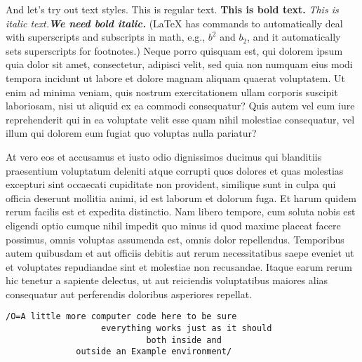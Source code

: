 And let's try out text styles.  This is regular text. \textbf{This is bold text.} \textit{This is italic text.}\textbf{\textit{We need bold italic.}} (LaTeX has commands to automatically deal with superscripts and subscripts in math, e.g., $b^{2}$ and $b_{2}$, and it automatically sets superscripts for footnotes.)  Neque porro quisquam est, qui dolorem ipsum quia dolor sit amet, consectetur, adipisci velit, sed quia non numquam eius modi tempora incidunt ut labore et dolore magnam aliquam quaerat voluptatem. Ut enim ad minima veniam, quis nostrum exercitationem ullam corporis suscipit laboriosam, nisi ut aliquid ex ea commodi consequatur? Quis autem vel eum iure reprehenderit qui in ea voluptate velit esse quam nihil molestiae consequatur, vel illum qui dolorem eum fugiat quo voluptas nulla pariatur? 

At vero eos et accusamus et iusto odio dignissimos ducimus qui blanditiis praesentium voluptatum deleniti atque corrupti quos dolores et quas molestias excepturi sint occaecati cupiditate non provident, similique sunt in culpa qui officia deserunt mollitia animi, id est laborum et dolorum fuga. Et harum quidem rerum facilis est et expedita distinctio. Nam libero tempore, cum soluta nobis est eligendi optio cumque nihil impedit quo minus id quod maxime placeat facere possimus, omnis voluptas assumenda est, omnis dolor repellendus. Temporibus autem quibusdam et aut officiis debitis aut rerum necessitatibus saepe eveniet ut et voluptates repudiandae sint et molestiae non recusandae. Itaque earum rerum hic tenetur a sapiente delectus, ut aut reiciendis voluptatibus maiores alias consequatur aut perferendis doloribus asperiores repellat.

\begin{lstlisting}[emph={computer},emphstyle=\bfseries,
emph={[2]everything,inside},emphstyle={[2]\itshape},
emph={[3]outside,Example},emphstyle={[3]\itshape\bfseries}]
/O=A little more computer code here to be sure 
                   everything works just as it should 
                            both inside and 
              outside an Example environment/       
\end{lstlisting}

